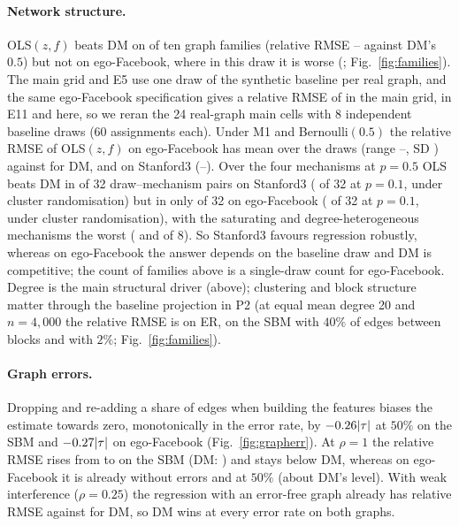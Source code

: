 \paragraph{Network structure.}\label{sec:struct} OLS$(z,f)$ beats DM on \EfiveBetterN{} of ten graph families (relative RMSE \EfiveLo--\EfiveHi{} against DM's $0.5$) but not on ego-Facebook, where in this draw it is worse (\EfiveEgo; Fig.~\ref{fig:families}). The main grid and E5 use one draw of the synthetic baseline per real graph, and the same ego-Facebook specification gives a relative RMSE of \MainEgoOls{} in the main grid, \EelevenEgoZero{} in E11 and \EfiveEgo{} here, so we reran the 24 real-graph main cells with 8 independent baseline draws (60 assignments each). Under M1 and Bernoulli$(0.5)$ the relative RMSE of OLS$(z,f)$ on ego-Facebook has mean \RdEgoOneMean{} over the draws (range \RdEgoOneLo--\RdEgoOneHi, SD \RdEgoOneSd) against \RdEgoOneDM{} for DM, and on Stanford3 \RdStanOneMean{} (\RdStanOneLo--\RdStanOneHi). Over the four mechanisms at $p=0.5$ OLS beats DM in \RdStanWinsHalf{} of 32 draw--mechanism pairs on Stanford3 (\RdStanWinsTenth{} of 32 at $p=0.1$, \RdStanWinsCl{} under cluster randomisation) but in only \RdEgoWinsHalf{} of 32 on ego-Facebook (\RdEgoWinsTenth{} of 32 at $p=0.1$, \RdEgoWinsCl{} under cluster randomisation), with the saturating and degree-heterogeneous mechanisms the worst (\RdEgoThreeHalf{} and \RdEgoFiveHalf{} of 8). So Stanford3 favours regression robustly, whereas on ego-Facebook the answer depends on the baseline draw and DM is competitive; the count of families above is a single-draw count for ego-Facebook. Degree is the main structural driver (above); clustering and block structure matter through the baseline projection in P2 (at equal mean degree 20 and $n=4{,}000$ the relative RMSE is \EfiveEr{} on ER, \EfiveSbmMid{} on the SBM with $40\%$ of edges between blocks and \EfiveSbmLo{} with $2\%$; Fig.~\ref{fig:families}).

\paragraph{Graph errors.} Dropping and re-adding a share of edges when building the features biases the estimate towards zero, monotonically in the error rate, by $-0.26|\tau|$ at $50\%$ on the SBM and $-0.27|\tau|$ on ego-Facebook (Fig.~\ref{fig:grapherr}). At $\rho=1$ the relative RMSE rises from \EelevenSbmZero{} to \EelevenSbmGOne{} on the SBM (DM: \EelevenSbmGOneDM) and stays below DM, whereas on ego-Facebook it is already \EelevenEgoZero{} without errors and \EelevenEgoGOne{} at $50\%$ (about DM's level). With weak interference ($\rho=0.25$) the regression with an error-free graph already has relative RMSE \EelevenWeakOls{} against \EelevenWeakDM{} for DM, so DM wins at every error rate on both graphs.

